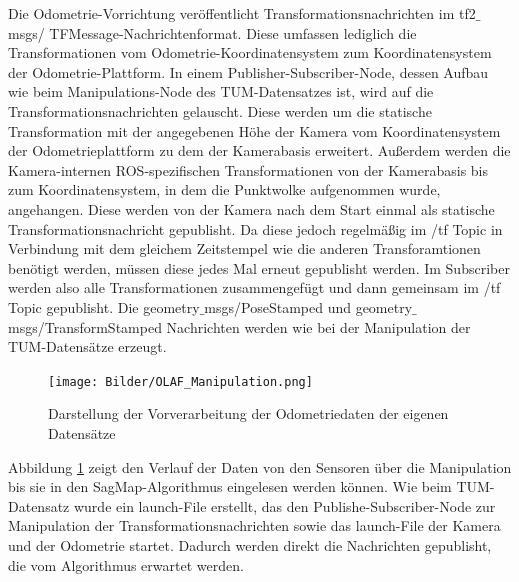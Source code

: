 Die Odometrie-Vorrichtung veröffentlicht Transformationsnachrichten im tf2$\_$msgs/ TFMessage-Nachrichtenformat. Diese umfassen lediglich die  Transformationen vom Odometrie-Koordinatensystem zum Koordinatensystem der Odometrie-Plattform. In einem Publisher-Subscriber-Node, dessen Aufbau wie beim Manipulations-Node des TUM-Datensatzes ist, wird auf die Transformationsnachrichten gelauscht. Diese werden um die statische Transformation mit der angegebenen Höhe der Kamera vom Koordinatensystem der Odometrieplattform zu dem der Kamerabasis erweitert. Außerdem werden die Kamera-internen ROS-spezifischen Transformationen von der Kamerabasis bis zum Koordinatensystem, in dem die Punktwolke aufgenommen wurde, angehangen. Diese werden von der Kamera nach dem Start  einmal als statische Transformationsnachricht gepublisht. Da diese jedoch regelmäßig im /tf Topic in Verbindung mit dem gleichem Zeitstempel wie die anderen Transforamtionen benötigt werden, müssen diese jedes Mal erneut gepublisht werden. Im Subscriber werden also alle Transformationen zusammengefügt und dann gemeinsam im /tf Topic gepublisht. Die geometry$\_$msgs/PoseStamped und geometry$\_$msgs/TransformStamped Nachrichten werden wie bei der Manipulation der TUM-Datensätze erzeugt. 

\begin{figure}
	\centering
	\texttt{[image: Bilder/OLAF\_Manipulation.png]}
	\caption{Darstellung der Vorverarbeitung der Odometriedaten der eigenen Datensätze}
	\label{fig:olaf_manipulation}
\end{figure}

Abbildung \ref{fig:olaf_manipulation} zeigt den Verlauf der Daten von den Sensoren über die Ma\-ni\-pu\-la\-tion bis sie in den SagMap-Algorithmus eingelesen werden können. Wie beim TUM-Datensatz wurde ein launch-File erstellt, das den Publishe-Subscriber-Node zur Manipulation der Transformationsnachrichten sowie das launch-File der Kamera und der Odometrie startet. Dadurch werden direkt die Nachrichten gepublisht, die vom Algorithmus erwartet werden. 